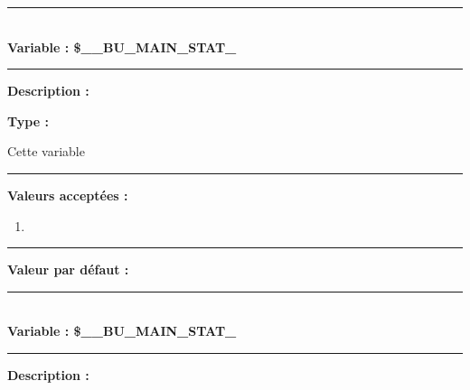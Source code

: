 \documentclass[a4paper,10pt]{article}
\begin{document}
\color{vars}\par\noindent\rule{\textwidth}{0.4pt}\color{text}\\[1\baselineskip]

\textbf{Variable : \color{vars}\$\_\_BU\_MAIN\_STAT\_}\\[1\baselineskip]

\par\noindent\rule{\textwidth}{0.4pt}

\begin{justify}
    \textbf{Description :}
\end{justify}

\setlength{\parskip}{1em}

\begin{justify}
    \textbf{Type : }
\end{justify}

\setlength{\parskip}{1em}

\begin{justify}
    Cette variable
\end{justify}

\par\noindent\rule{\textwidth}{0.4pt}

\textbf{Valeurs acceptées :}
\begin{enumerate}
    \item
\end{enumerate}

\par\noindent\rule{\textwidth}{0.4pt}

\textbf{Valeur par défaut :}




\color{vars}\par\noindent\rule{\textwidth}{0.4pt}\color{text}\\[1\baselineskip]

\textbf{Variable : \color{vars}\$\_\_BU\_MAIN\_STAT\_}\\[1\baselineskip]

\par\noindent\rule{\textwidth}{0.4pt}

\begin{justify}
    \textbf{Description :}
\end{justify}

\setlength{\parskip}{1em}
\end{document}

